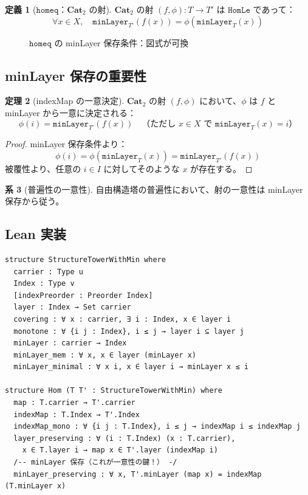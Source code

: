 \documentclass{ltjsarticle}
\theoremstyle{definition}
\newtheorem{definition}{定義}[section]
\newtheorem{theorem}[definition]{定理}
\newtheorem{corollary}[definition]{系}
\newcommand{\cattwo}{\mathbf{Cat}_2}
\newcommand{\HomLe}{\mathtt{HomLe}}
\newcommand{\homeq}{\mathtt{homeq}}
\newcommand{\minLayer}{\mathtt{minLayer}}
\begin{document}
\begin{definition}[$\homeq$：$\cattwo$ の射]
\label{def:homeq}
$\cattwo$ の射 $(f, \phi) : T \to T'$ は $\HomLe$ であって：
\[
  \forall x \in X, \quad \minLayer_{T'}(f(x)) = \phi(\minLayer_T(x))
\]
\end{definition}

\begin{figure}[htbp]
\centering
{}
\caption{$\homeq$ の minLayer 保存条件：図式が可換}
\label{fig:homeq-minlayer}
\end{figure}

\subsection{minLayer 保存の重要性}

\begin{theorem}[indexMap の一意決定]
$\cattwo$ の射 $(f, \phi)$ において、$\phi$ は $f$ と minLayer から一意に決定される：
\[
  \phi(i) = \minLayer_{T'}(f(x)) \quad \text{（ただし $x \in X$ で $\minLayer_T(x) = i$）}
\]
\end{theorem}

\begin{proof}
minLayer 保存条件より：
\[
  \phi(i) = \phi(\minLayer_T(x)) = \minLayer_{T'}(f(x))
\]
被覆性より、任意の $i \in I$ に対してそのような $x$ が存在する。
\end{proof}

\begin{corollary}[普遍性の一意性]
自由構造塔の普遍性において、射の一意性は minLayer 保存から従う。
\end{corollary}

\subsection{Lean 実装}

\begin{lstlisting}[caption=StructureTowerWithMin と Hom の定義（CAT2\_complete.lean より）]
structure StructureTowerWithMin where
  carrier : Type u
  Index : Type v
  [indexPreorder : Preorder Index]
  layer : Index → Set carrier
  covering : ∀ x : carrier, ∃ i : Index, x ∈ layer i
  monotone : ∀ {i j : Index}, i ≤ j → layer i ⊆ layer j
  minLayer : carrier → Index
  minLayer_mem : ∀ x, x ∈ layer (minLayer x)
  minLayer_minimal : ∀ x i, x ∈ layer i → minLayer x ≤ i

structure Hom (T T' : StructureTowerWithMin) where
  map : T.carrier → T'.carrier
  indexMap : T.Index → T'.Index
  indexMap_mono : ∀ {i j : T.Index}, i ≤ j → indexMap i ≤ indexMap j
  layer_preserving : ∀ (i : T.Index) (x : T.carrier),
    x ∈ T.layer i → map x ∈ T'.layer (indexMap i)
  /-- minLayer 保存（これが一意性の鍵！） -/
  minLayer_preserving : ∀ x, T'.minLayer (map x) = indexMap (T.minLayer x)
\end{lstlisting}
\end{document}
